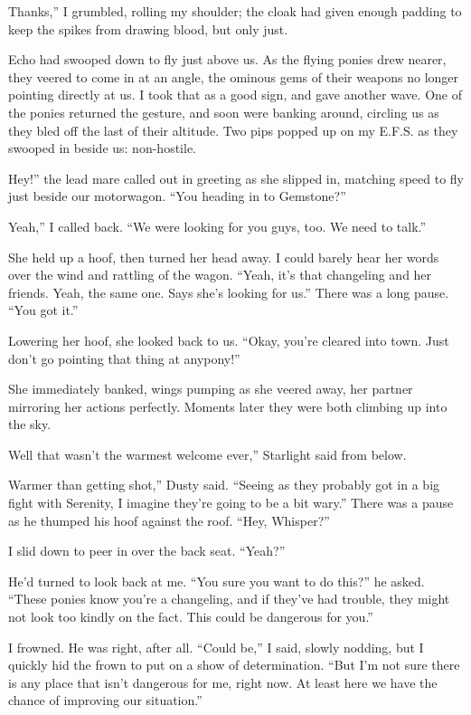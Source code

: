 \leavevmode{}Thanks,” I grumbled, rolling my shoulder; the cloak had given enough padding to keep the spikes from drawing blood, but only just.

Echo had swooped down to fly just above us. As the flying ponies drew nearer, they veered to come in at an angle, the ominous gems of their weapons no longer pointing directly at us. I took that as a good sign, and gave another wave. One of the ponies returned the gesture, and soon were banking around, circling us as they bled off the last of their altitude. Two pips popped up on my E.F.S. as they swooped in beside us: non-hostile.

\leavevmode{}Hey!” the lead mare called out in greeting as she slipped in, matching speed to fly just beside our motorwagon. “You heading in to Gemstone?”

\leavevmode{}Yeah,” I called back. “We were looking for you guys, too. We need to talk.”

She held up a hoof, then turned her head away. I could barely hear her words over the wind and rattling of the wagon. “Yeah, it’s that changeling and her friends. Yeah, the same one. Says she’s looking for us.” There was a long pause. “You got it.”

Lowering her hoof, she looked back to us. “Okay, you’re cleared into town. Just don’t go pointing that thing at anypony!”

She immediately banked, wings pumping as she veered away, her partner mirroring her actions perfectly. Moments later they were both climbing up into the sky.

\leavevmode{}Well that wasn’t the warmest welcome ever,” Starlight said from below.

\leavevmode{}Warmer than getting shot,” Dusty said. “Seeing as they probably got in a big fight with Serenity, I imagine they’re going to be a bit wary.” There was a pause as he thumped his hoof against the roof. “Hey, Whisper?”

I slid down to peer in over the back seat. “Yeah?”

He’d turned to look back at me. “You sure you want to do this?” he asked. “These ponies know you’re a changeling, and if they’ve had trouble, they might not look too kindly on the fact. This could be dangerous for you.”

I frowned. He was right, after all. “Could be,” I said, slowly nodding, but I quickly hid the frown to put on a show of determination. “But I’m not sure there is any place that isn’t dangerous for me, right now. At least here we have the chance of improving our situation.”

